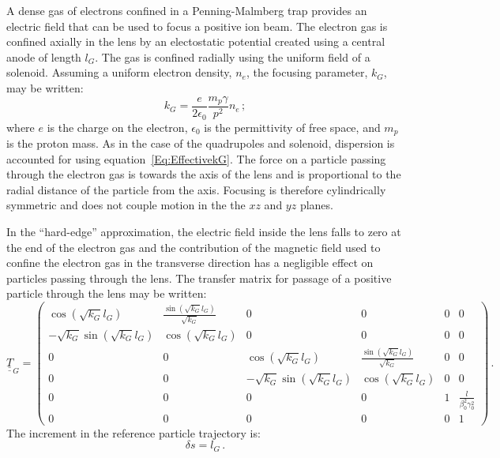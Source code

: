 A dense gas of electrons confined in a Penning-Malmberg trap provides
an electric field that can be used to focus a positive ion beam.
The electron gas is confined axially in the lens by an electostatic
potential created using a central anode of length $l_G$.
The gas is confined radially using the uniform field of a solenoid.
Assuming a uniform electron density, $n_e$, the focusing parameter,
$k_G$, may be written:
\begin{equation}
  k_G = \frac{e}{2\epsilon_0} \frac{m_p \gamma}{p^2} n_e \,;
            \label{Eq:EffectivekG}
\end{equation}
where $e$ is the charge on the electron, $\epsilon_0$ is the
permittivity of free space, and $m_p$ is the proton mass.
As in the case of the quadrupoles and solenoid, dispersion is
accounted for using equation~\ref{Eq:EffectivekG}.
The force on a particle passing through the electron gas is towards
the axis of the lens and is proportional to the radial distance of the
particle from the axis.
Focusing is therefore cylindrically symmetric and does not couple
motion in the the $xz$ and $yz$ planes.

In the ``hard-edge'' approximation, the electric field inside the
lens falls to zero at the end of the electron gas and the contribution
of the magnetic field used to confine the electron gas in the
transverse direction has a negligible effect on particles passing
through the lens.
The transfer matrix for passage of a positive particle through the
lens may be written: 
\begin{equation}
  \underline{\underline{T}}_{G} =
    \begin{pmatrix}
                    \cos(\sqrt{k_G} l_G) & \frac{\sin(\sqrt{k_G} l_G)}{\sqrt{k_G}} &  0 & 0 & 0 & 0 \\
        -\sqrt{k_G} \sin(\sqrt{k_G} l_G) &                    \cos(\sqrt{k_G} l_G) &  0 & 0 & 0 & 0 \\
                                     0 &                                     0 &              \cos(\sqrt{k_G} l_G) & \frac{\sin(\sqrt{k_G} l_G)}{\sqrt{k_G}}  & 0 & 0 \\
                                     0 &                                     0 &  -\sqrt{k_G} \sin(\sqrt{k_G} l_G) &                     \cos(\sqrt{k_G} l_G) & 0 & 0 \\
          0 & 0 & 0 & 0 & 1 & \frac{l}{\beta_0^2 \gamma_0^2} \\
          0 & 0 & 0 & 0 & 0 &                             1
        \end{pmatrix} \, .
\end{equation}
The increment in the reference particle trajectory is:
\begin{equation}
  \delta s = l_G \, .
\end{equation}

